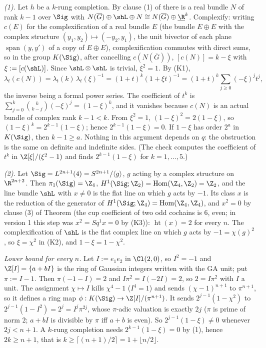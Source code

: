 \emph{(1).} Let $h$ be a $k$-rung completion. By clause (1) of  there is a real bundle $N$ of rank $k - 1$ over $\Sig$ with $N(\overline G) \oplus \shL \oplus N \cong N(\overline G) \oplus \underline{\R}^{k}$. Complexify: writing $c(E)$ for the complexification of a real bundle $E$ (the bundle $E \oplus E$ with the complex structure $(y_1, y_2) \mapsto (-y_2, y_1)$, the unit bivector of each plane $\operatorname{span}(y, y')$ of a copy of $E \oplus E$), complexification commutes with direct sums, so in the group $K(\Sig)$, after cancelling $c(N(\overline G))$, $[c(N)] = k - \xi$ with $\xi := [c(\shL)]$. Since $\shL \otimes \shL$ is trivial, $\xi^{2} = 1$. By (K1),
\[
\lambda_t(c(N)) = \lambda_t(k)\,\lambda_t(\xi)^{-1} = (1+t)^{k}(1 + \xi t)^{-1} = (1+t)^{k} \sum_{j \geq 0} (-\xi)^{j} t^{j},
\]
the inverse being a formal power series. The coefficient of $t^{k}$ is $\sum_{j=0}^{k} \binom{k}{k-j}(-\xi)^{j} = (1 - \xi)^{k}$, and it vanishes because $c(N)$ is an actual bundle of complex rank $k - 1 < k$. From $\xi^{2} = 1$, $(1-\xi)^{2} = 2(1 - \xi)$, so $(1-\xi)^{k} = 2^{k-1}(1-\xi)$; hence $2^{k-1}(1-\xi) = 0$. If $1 - \xi$ has order $2^{a}$ in $K(\Sig)$, then $k - 1 \geq a$. Nothing in this argument depends on $q$: the obstruction is the same on definite and indefinite sides. (The check computes the coefficient of $t^{k}$ in $\Z[\xi]/(\xi^{2} - 1)$ and finds $2^{k-1}(1-\xi)$ for $k = 1, \dots, 5$.)

\emph{(2).} Let $\Sig = L^{2n+1}(4) = S^{2n+1}/\langle g \rangle$, $g$ acting by a complex structure on $\R^{2n+2}$. Then $\pi_1(\Sig) = \Z_{4}$, $H^{1}(\Sig; \Z_{2}) = \operatorname{Hom}(\Z_{4}, \Z_{2}) = \Z_{2}$, and the line bundle $\shL$ with $x \neq 0$ is the flat line on which $g$ acts by $-1$. Its class $x$ is the reduction of the generator of $H^{1}(\Sig; \Z_{4}) = \operatorname{Hom}(\Z_{4}, \Z_{4})$, and $x^{2} = 0$ by clause (3) of Theorem  (the cup coefficient of two odd cochains is $6$, even; in version 1 this step was $x^{2} = Sq^{1}x = 0$ by (K3)): $\operatorname{ht}(x) = 2$ for every $n$. The complexification of $\shL$ is the flat complex line on which $g$ acts by $-1 = \chi(g)^{2}$, so $\xi = \chi^{2}$ in (K2), and $1 - \xi = 1 - \chi^{2}$.

\emph{Lower bound for every $n$.} Let $I := e_1 e_2$ in $\Cl(2,0)$, so $I^{2} = -1$ and $\Z[I] = \{a + bI\}$ is the ring of Gaussian integers written with the GA unit; put $\pi := I - 1$. Then $\pi(-1 - I) = 2$ and $I\pi^{2} = I(-2I) = 2$, so $2 = I \pi^{2}$ with $I$ a unit. The assignment $\chi \mapsto I$ kills $\chi^{4} - 1$ ($I^{4} = 1$) and sends $(\chi - 1)^{n+1}$ to $\pi^{n+1}$, so it defines a ring map $\phi : K(\Sig) \to \Z[I]/(\pi^{n+1})$. It sends $2^{j-1}(1 - \chi^{2})$ to $2^{j-1}(1 - I^{2}) = 2^{j} = I^{j}\pi^{2j}$, whose $\pi$-adic valuation is exactly $2j$ ($\pi$ is prime of norm $2$; $a + bI$ is divisible by $\pi$ iff $a + b$ is even). So $2^{j-1}(1 - \xi) \neq 0$ whenever $2j < n + 1$. A $k$-rung completion needs $2^{k-1}(1-\xi) = 0$ by (1), hence $2k \geq n + 1$, that is $k \geq \lceil (n+1)/2 \rceil = 1 + \lfloor n/2 \rfloor$.

